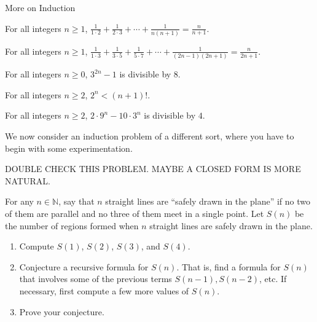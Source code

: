\begin{section}{More on Induction}
\begin{theorem}
For all integers $n \ge 1$, $\displaystyle{\frac{1}{1\cdot 2} + \frac{1}{2\cdot 3} + \cdots + \frac{1}{n(n+1)} = \frac{n}{n+1}}$.
\end{theorem}

\begin{theorem}
For all integers $n \ge 1$, $\displaystyle{\frac{1}{1\cdot 3} + \frac{1}{3\cdot 5} + \frac{1}{5\cdot7} + \cdots + \frac{1}{(2n-1)(2n+1)} = \frac{n}{2n+1}}$.
\end{theorem}

\begin{theorem}\label{thm:3^{2n}-1 div by 8}
For all integers $n \ge 0$, $3^{2n}-1$ is divisible by $8$.
\end{theorem}

\begin{theorem}
For all integers $n \ge 2$, $2^n < (n+1)!$.
\end{theorem}

\begin{theorem}
For all integers $n \ge 2$, $2\cdot 9^n - 10 \cdot 3^n$ is divisible by $4$.
\end{theorem}

We now consider an induction problem of a different sort, where you have to begin with some experimentation.

DOUBLE CHECK THIS PROBLEM.  MAYBE A CLOSED FORM IS MORE NATURAL.

\begin{problem}
For any $n \in \mathbb{N}$, say that $n$ straight lines are ``safely drawn in the plane'' if no two of them are parallel and no three of them meet in a single point. Let $S(n)$ be the number of regions formed when $n$ straight lines are safely drawn in the plane.
\begin{enumerate}[label=\textrm{(\alph*)}]
\item Compute $S(1)$, $S(2)$, $S(3)$, and $S(4)$.
\item Conjecture a recursive formula for $S(n)$. That is, find a formula for $S(n)$ that involves some of the previous terms $S(n-1), S(n-2)$, etc. If necessary, first compute a few more values of $S(n)$.
\item Prove your conjecture.
\end{enumerate}
\end{problem}


\end{section}
